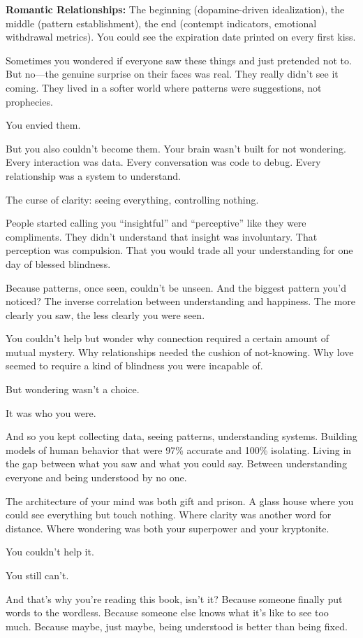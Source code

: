 \documentclass[12pt,letterpaper]{book}
\begin{document}
\textbf{Romantic Relationships:} The beginning (dopamine-driven idealization), the middle (pattern establishment), the end (contempt indicators, emotional withdrawal metrics). You could see the expiration date printed on every first kiss.

Sometimes you wondered if everyone saw these things and just pretended not to. But no—the genuine surprise on their faces was real. They really didn't see it coming. They lived in a softer world where patterns were suggestions, not prophecies.

You envied them.

But you also couldn't become them. Your brain wasn't built for not wondering. Every interaction was data. Every conversation was code to debug. Every relationship was a system to understand.

The curse of clarity: seeing everything, controlling nothing.

People started calling you ``insightful'' and ``perceptive'' like they were compliments. They didn't understand that insight was involuntary. That perception was compulsion. That you would trade all your understanding for one day of blessed blindness.

Because patterns, once seen, couldn't be unseen. And the biggest pattern you'd noticed? The inverse correlation between understanding and happiness. The more clearly you saw, the less clearly you were seen.

You couldn't help but wonder why connection required a certain amount of mutual mystery. Why relationships needed the cushion of not-knowing. Why love seemed to require a kind of blindness you were incapable of.

But wondering wasn't a choice.

It was who you were.

And so you kept collecting data, seeing patterns, understanding systems. Building models of human behavior that were 97\% accurate and 100\% isolating. Living in the gap between what you saw and what you could say. Between understanding everyone and being understood by no one.

The architecture of your mind was both gift and prison. A glass house where you could see everything but touch nothing. Where clarity was another word for distance. Where wondering was both your superpower and your kryptonite.

You couldn't help it.

You still can't.

And that's why you're reading this book, isn't it? Because someone finally put words to the wordless. Because someone else knows what it's like to see too much. Because maybe, just maybe, being understood is better than being fixed.
\end{document}
